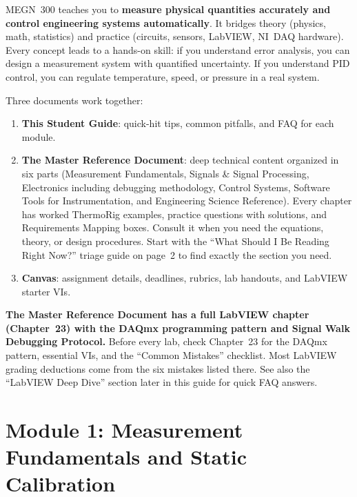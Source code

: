 \documentclass[11pt,letterpaper]{article}
\begin{document}
\begin{faqbox}
MEGN~300 teaches you to \textbf{measure physical quantities accurately and control engineering systems automatically}. It bridges theory (physics, math, statistics) and practice (circuits, sensors, LabVIEW, NI~DAQ hardware). Every concept leads to a hands-on skill: if you understand error analysis, you can design a measurement system with quantified uncertainty. If you understand PID control, you can regulate temperature, speed, or pressure in a real system.
\end{faqbox}

\begin{faqbox}
Three documents work together:
\begin{enumerate}[leftmargin=*, itemsep=1pt, topsep=0pt]
    \item \textbf{This Student Guide}: quick-hit tips, common pitfalls, and FAQ for each module.
    \item \textbf{The Master Reference Document}: deep technical content organized in six parts (Measurement Fundamentals, Signals \& Signal Processing, Electronics including debugging methodology, Control Systems, Software Tools for Instrumentation, and Engineering Science Reference). Every chapter has worked ThermoRig examples, practice questions with solutions, and Requirements Mapping boxes. Consult it when you need the equations, theory, or design procedures. Start with the ``What Should I Be Reading Right Now?'' triage guide on page~2 to find exactly the section you need.
    \item \textbf{Canvas}: assignment details, deadlines, rubrics, lab handouts, and LabVIEW starter VIs.
\end{enumerate}
\end{faqbox}

\begin{protip}
\textbf{The Master Reference Document has a full LabVIEW chapter (Chapter~23) with the DAQmx programming pattern and Signal Walk Debugging Protocol.} Before every lab, check Chapter~23 for the DAQmx pattern, essential VIs, and the ``Common Mistakes'' checklist. Most LabVIEW grading deductions come from the six mistakes listed there. See also the ``LabVIEW Deep Dive'' section later in this guide for quick FAQ answers.
\end{protip}

\section{Module 1: Measurement Fundamentals and Static Calibration}
\end{document}
